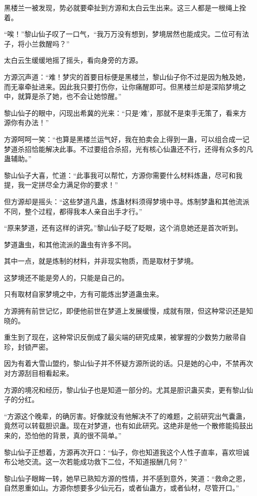 \begin{this_body}
黑楼兰一被发现，势必就要牵扯到方源和太白云生出来。这三人都是一根绳上拴着。

“唉！”黎山仙子叹了一口气，“我万万没有想到，梦境居然也能成灾。二位可有法子，将小兰救醒吗？”

太白云生缓缓地摇了摇头，看向身旁的方源。

方源沉声道：“难！梦灾的首要目标便是黑楼兰，黎山仙子你不过是因为触及她，而无辜牵扯进来。因此我只要打伤你，让你痛醒即可。但黑楼兰却是深陷梦境之中，就算是杀了她，也不会让她惊醒。”

黎山仙子的眼中，闪现出希冀的光来：“只是‘难’，那就不是束手无策了，看来方源你有办法！”

方源呵呵一笑：“也算是黑楼兰运气好，我在拍卖会上得到一蛊，可以组合成一记梦道杀招恰能解决此事。不过要组合杀招，光有核心仙蛊还不行，还得有众多的凡蛊辅助。”

黎山仙子大喜，忙道：“此事我可以帮忙，方源你需要什么材料炼蛊，尽可和我提，我一定拼尽全力满足你的要求！”

但方源却是摇头：“这些梦道凡蛊，炼蛊材料须得梦境中寻。炼制梦蛊和其他流派不同，整个过程，都得我本人亲自出手才行。”

“原来梦道，还有这样的讲究。”黎山仙子眨了眨眼，这个消息她还是首次听到。

梦道蛊虫，和其他流派的蛊虫有许多不同。

其中一点，就是炼制的材料，并非现实物质，而是取材于梦境。

这梦境还不能是旁人的，只能是自己的。

只有取材自家梦境之中，方有可能炼出梦道蛊虫来。

方源拥有前世记忆，即便他前世在梦道上发展缓慢，成就有限，但这种常识还是知晓的。

重生到了现在，这种常识反倒成了最尖端的研究成果，被掌握的少数势力敝帚自珍，封锁严密。

因为有着大雪山盟约，黎山仙子并不怀疑方源所说的话。只是她的心中，不禁再次对方源刮目相看起来。

方源的境况和经历，黎山仙子也是知道一部分的。尤其是胆识蛊买卖，更有黎山仙子的分红。

“方源这个晚辈，的确厉害。好像就没有他解决不了的难题，之前研究出气囊蛊，竟然可以转载胆识蛊。现在对梦道，也有如此研究。这绝非是他一个散修能捣鼓出来的，恐怕他的背景，真的很不简单。”

黎山仙子正想着，方源再次开口：“仙子，你也知道我这个人性子直率，喜欢坦诚布公地交流。这一次若能成功救下二位，不知道报酬几何？”

黎山仙子眼眸一转，她早已熟知方源的性情，并不感到意外，笑道：“救命之恩，自然恩重如山。方源你想要多少仙元石，或者仙蛊方，或者仙材，尽管开口。”


\end{this_body}
